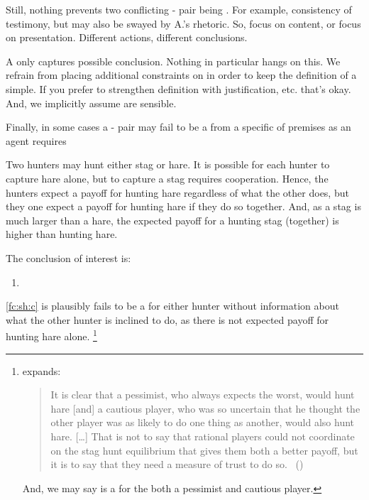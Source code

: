 \begin{note}
  Still, nothing prevents two conflicting - pair being .
  For example, consistency of testimony, but may also be swayed by A.'s rhetoric.
  So, focus on content, or focus on presentation.
  Different actions, different conclusions.

  A \fc{} only captures possible conclusion.
  Nothing in particular hangs on this.
  We refrain from placing additional constraints on  in order to keep the definition of a \fc{} simple.
  If you prefer to strengthen definition with justification, etc. that's okay.
  And, we implicitly assume  are sensible.
\end{note}

\begin{note}
  Finally, in some cases a - pair may fail to be a \fc{} from a specific \pool{} of premises as an agent requires 

  \begin{scenario}%
    \label{fc:sh}%
    Two hunters may hunt either stag or hare.
    It is possible for each hunter to capture hare alone, but to capture a stag requires cooperation.
    Hence, the hunters expect a payoff for hunting hare regardless of what the other does, but they one expect a payoff for hunting hare if they do so together.
    And, as a stag is much larger than a hare, the expected payoff for a hunting stag (together) is higher than hunting hare.
  \end{scenario}

  \noindent%
  The conclusion of interest is:

  \begin{enumerate}[label=C\thescenarioCounter., ref=(C\thescenarioCounter)]
  \item
    \label{fc:sh:c}
  \end{enumerate}
  \ref{fc:sh:c} is plausibly fails to be a \fc{} for either hunter without information about what the other hunter is inclined to do, as there is not expected payoff for hunting hare alone.%
  \footnote{
    \citeauthor{Skyrms:2004aa} expands:
    \begin{quote}
      It is clear that a pessimist, who always expects the worst, would hunt hare [and] a cautious player, who was so uncertain that he thought the other player was as likely to do one thing as another, would also hunt hare.
      [\dots]
      That is not to say that rational players could not coordinate on the stag hunt equilibrium that gives them both a better payoff, but it is to say that they need a measure of trust to do so.%
      \mbox{ }\hfill\mbox{(\citeyear[3]{Skyrms:2004aa})}
    \end{quote}
    And, we may say  is a \fc{} for the both a pessimist and cautious player.
  }

\end{note}

